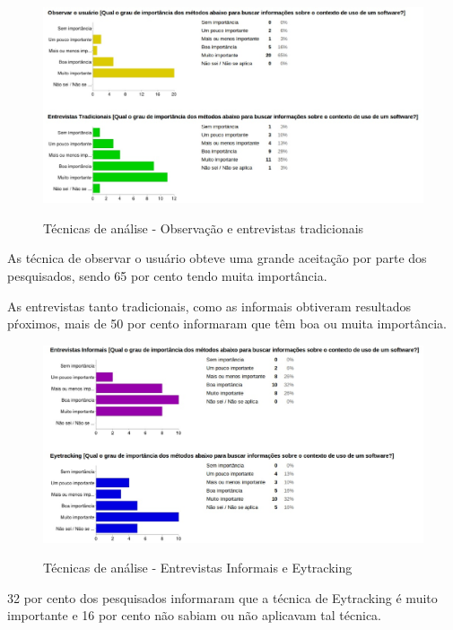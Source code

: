 	\begin{figure}[!h]
    	\centering
    	\includegraphics[keepaspectratio=true,scale=0.55]
      		{figuras/analise1.eps}
    	\label{check04}
		\caption{Técnicas de análise - Observação e entrevistas tradicionais}
	\end{figure}
	
	As técnica de observar o usuário obteve uma grande aceitação por parte dos pesquisados, sendo 65 por cento tendo muita importância.
	 
	As entrevistas tanto tradicionais, como as informais obtiveram resultados pŕoximos, mais de 50 por cento informaram que têm boa ou muita importância.
		
	\begin{figure}[!h]
    	\centering
    	\includegraphics[keepaspectratio=true,scale=0.55]
      		{figuras/analise2.eps}
    	\label{check04}
		\caption{Técnicas de análise - Entrevistas Informais e Eytracking}
	\end{figure}

	32 por cento dos pesquisados informaram que a técnica de Eytracking é muito importante e 16 por cento não sabiam ou não aplicavam tal técnica.
		
